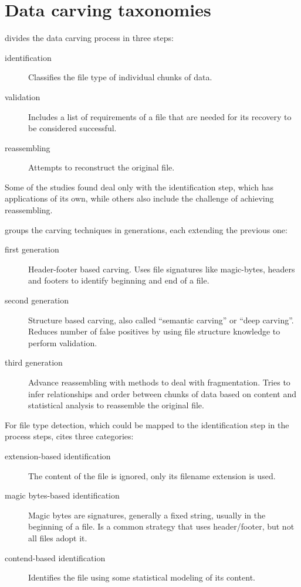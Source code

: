 \section{Data carving taxonomies}

\cite{ali_review_2018} divides the data carving process in three steps:
\begin{description}
    \item [identification] Classifies the file type of individual chunks of data. 
    \item[validation] Includes a list of requirements of a file that are needed for its recovery to be considered successful.
    \item [reassembling] Attempts to reconstruct the original file.
\end{description}

Some of the studies found deal only with the identification step, which has applications of its own, while others also include the challenge of achieving reassembling.

\cite{nadeem_ashraf_forensic_2013} groups the carving techniques in generations, each extending the previous one:
\begin{description}
    \item [first generation] Header-footer based carving. Uses file signatures like magic-bytes, headers and footers to identify beginning and end of a file.
    \item [second generation] Structure based carving, also called ``semantic carving'' or ``deep carving''. Reduces number of false positives by using file structure knowledge to perform validation.
    \item [third generation] Advance reassembling with methods to deal with fragmentation. Tries to infer relationships and order between chunks of data based on content and statistical analysis to reassemble the original file.
\end{description}

For file type detection, which could be mapped to the identification step in the \cite{ali_review_2018} process steps, \cite{amirani_new_2008} cites three categories:
\begin{description}
    \item [extension-based identification] The content of the file is ignored, only its filename extension is used.
    \item [magic bytes-based identification] Magic bytes are signatures, generally a fixed string, usually in the beginning of a file. Is a common strategy that uses header/footer, but not all files adopt it.
    \item [contend-based identification] Identifies the file using some statistical modeling of its content. 
\end{description}

